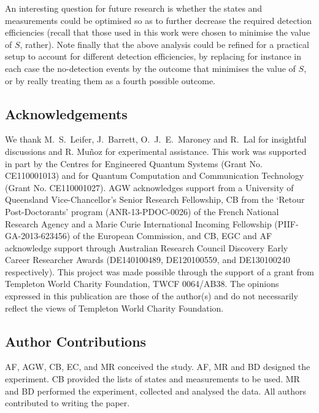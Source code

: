 \documentclass[aps,prl,floatfix,onecolumn,tightenlines,amsmath,amssymb,nofootinbib,12pt]{revtex4-2}
\begin{document}
An interesting question for future research is whether the states and measurements could be optimised so as to further decrease the required detection efficiencies (recall that those used in this work were chosen to minimise the value of $S$, rather). 
Note finally that the above analysis could be refined for a practical setup to account for different detection efficiencies, by replacing for instance in each case the no-detection events by the outcome that minimises the value of $S$, or by really treating them as a fourth possible outcome.


\subsection{Acknowledgements}
We thank M.~S.~Leifer, J.~Barrett, O.~J.~E.~Maroney and R.~Lal for insightful discussions and R. Mu\~noz for experimental assistance. This work was supported in part by the Centres for Engineered Quantum Systems (Grant No. CE110001013) and for Quantum Computation and Communication Technology (Grant No. CE110001027). AGW acknowledges support from a University of Queensland Vice-Chancellor's Senior Research Fellowship, CB from the `Retour Post-Doctorants' program (ANR-13-PDOC-0026) of the French National Research Agency and a Marie Curie International Incoming Fellowship (PIIF-GA-2013-623456) of the European Commission, and CB, EGC and AF acknowledge support through Australian Research Council Discovery Early Career Researcher Awards (DE140100489, DE120100559, and DE130100240 respectively). This project was made possible through the support of a grant from Templeton World Charity Foundation, TWCF 0064/AB38.  The opinions expressed in this publication are those of the author(s) and do not necessarily reflect the views of Templeton World Charity Foundation.

\subsection{Author Contributions} 
AF, AGW, CB, EC, and MR conceived the study. AF, MR and BD designed the experiment. CB provided the lists of states and measurements to be used. MR and BD performed the experiment, collected and analysed the data. All authors contributed to writing the paper.
\end{document}
